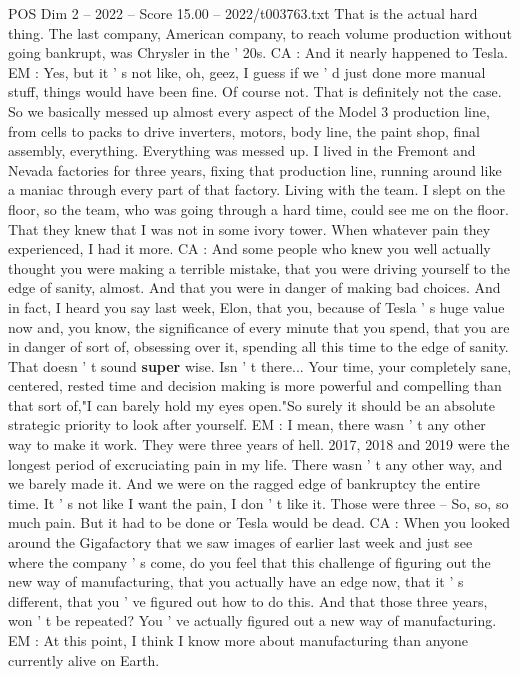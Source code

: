 \begin{textsample}{POS Dim 2 – 2022 – Score 15.00 – 2022/t003763.txt}
That is the actual hard thing.
The last company, American company, to reach volume production without going bankrupt, was Chrysler in the ' 20s.
CA : And it nearly happened to Tesla.
EM : Yes, but it ' s not like, oh, geez, I guess if we ' d just done more manual stuff, things would have been fine.
Of course not.
That is definitely not the case.
So we basically messed up almost every aspect of the Model 3 production line, from cells to packs to drive inverters, motors, body line, the paint shop, final assembly, everything.
Everything was messed up.
I lived in the Fremont and Nevada factories for three years, fixing that production line, running around like a maniac through every part of that factory.
Living with the team.
I slept on the floor, so the team, who was going through a hard time, could see me on the floor.
That they knew that I was not in some ivory tower.
When whatever pain they experienced, I had it more.
CA : And some people who knew you well actually thought you were making a terrible mistake, that you were driving yourself to the edge of sanity, almost.
And that you were in danger of making bad choices.
And in fact, I heard you say last week, Elon, that you, because of Tesla ' s huge value now and, you know, the significance of every minute that you spend, that you are in danger of sort of, obsessing over it, spending all this time to the edge of sanity.
That doesn ' t sound \textbf{super} wise.
Isn ' t there...
Your time, your completely sane, centered, rested time and decision making is more powerful and compelling than that sort of,"I can barely hold my eyes open."So surely it should be an absolute strategic priority to look after yourself.
EM : I mean, there wasn ' t any other way to make it work.
They were three years of hell. 2017, 2018 and 2019 were the longest period of excruciating pain in my life.
There wasn ' t any other way, and we barely made it.
And we were on the ragged edge of bankruptcy the entire time.
It ' s not like I want the pain, I don ' t like it.
Those were three -- So, so, so much pain.
But it had to be done or Tesla would be dead.
CA : When you looked around the Gigafactory that we saw images of earlier last week and just see where the company ' s come, do you feel that this challenge of figuring out the new way of manufacturing, that you actually have an edge now, that it ' s different, that you ' ve figured out how to do this.
And that those three years, won ' t be repeated?
You ' ve actually figured out a new way of manufacturing.
EM : At this point, I think I know more about manufacturing than anyone currently alive on Earth.

\end{textsample}
